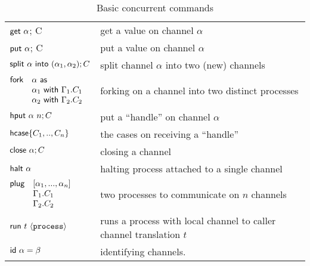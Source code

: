 \documentclass[11pt]{article}
\newcommand{\<}{\langle}
\renewcommand{\>}{\rangle}
\begin{document}
\begin{table}
\begin{center}

\begin{tabular}{l||l}
${\sf get}~\alpha$; C & get a value on channel $\alpha$ \\
${\sf put}~\alpha$; C & put a value on channel $\alpha$ \\ \hline
${\sf split}~\alpha~{\sf into}~(\alpha_1,\alpha_2); C$ & split channel $\alpha$ into two (new) channels \\
$\!\!\!\begin{array}{ll}{\sf fork} & \alpha~{\sf as} \\
                           & \alpha_1~{\sf with}~\Gamma_1. C_1 \\
                           & \alpha_2~{\sf with}~\Gamma_2. C_2  \end{array}$ & forking on a channel into two distinct processes \\ \hline

${\sf hput}~\alpha~n; C$ & put a ``handle'' on channel $\alpha$ \\
${\sf hcase} \{ C_1,..,C_n\}$ & the cases on receiving a ``handle'' \\ \hline 

${\sf close}~ \alpha; C$ & closing a channel \\
${\sf halt}~\alpha$ & halting process attached to a single channel \\ \hline

$\!\!\!\begin{array}{ll}{\sf plug} & [\alpha_1,...,\alpha_n] \\
                           & \Gamma_1. C_1 \\
                           & \Gamma_2. C_2  \end{array}$ & two processes to communicate on $n$ channels \\ \hline 
${\sf run}~t~\< {\tt process} \>$ & runs a process with local channel to caller channel translation $t$ \\ \hline 


${\sf id}~\alpha = \beta$ & identifying channels.
\end{tabular}
\caption{Basic concurrent commands}
\label{concurrent-commands}
\end{center}
\end{table}
\end{document}
